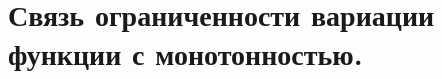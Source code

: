 \documentclass[../main.tex]{subfiles}
\begin{document}
\newpage
\section{Связь ограниченности вариации функции с монотонностью.}
\end{document}
